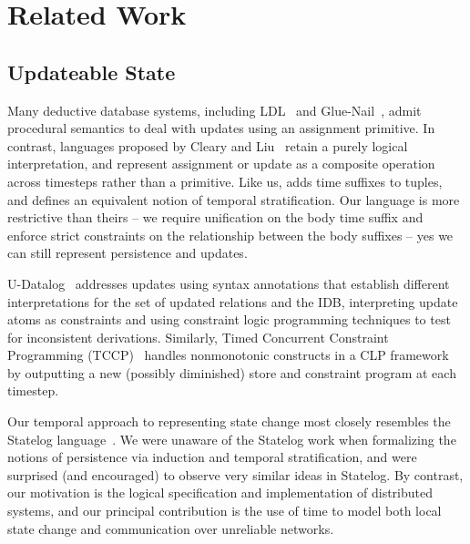\section{Related Work}

\subsection{Updateable State}

Many deductive database systems, including LDL~\cite{ldl} and
Glue-Nail~\cite{glue-nail}, admit procedural semantics to deal with updates
using an assignment primitive.  In contrast, languages proposed by Cleary and
Liu~\cite{harmful,deductiveupdates,starlog} retain a purely logical
interpretation, and represent assignment or update as a composite operation
across timesteps rather than a primitive.  Like us, \cite{deductiveupdates}
adds time suffixes to tuples, and defines an equivalent notion of temporal
stratification.  Our language is more restrictive than theirs -- we require
unification on the body time suffix and enforce strict constraints on the
relationship between the body suffixes -- yes we can still represent persistence
and updates.

U-Datalog~\cite{udatalog-neg} addresses updates using syntax annotations that establish different interpretations for the set of updated 
relations and the IDB, interpreting update atoms as constraints and using constraint logic programming techniques to test for inconsistent
derivations.  Similarly, Timed Concurrent Constraint Programming (TCCP)~\cite{tdccp,tccp} handles nonmonotonic constructs in a CLP framework
by outputting a new (possibly diminished) store and constraint program at each timestep.  

Our temporal approach to representing state change most closely resembles the
Statelog language~\cite{statelog}.  
We were unaware of the Statelog work when formalizing the 
notions of persistence via induction and temporal stratification, and were surprised
(and encouraged) to observe very similar ideas in Statelog.  By contrast, our motivation is
the logical specification and implementation of distributed systems, and our 
principal contribution is the use of time to model both local state change and communication
over unreliable networks.

